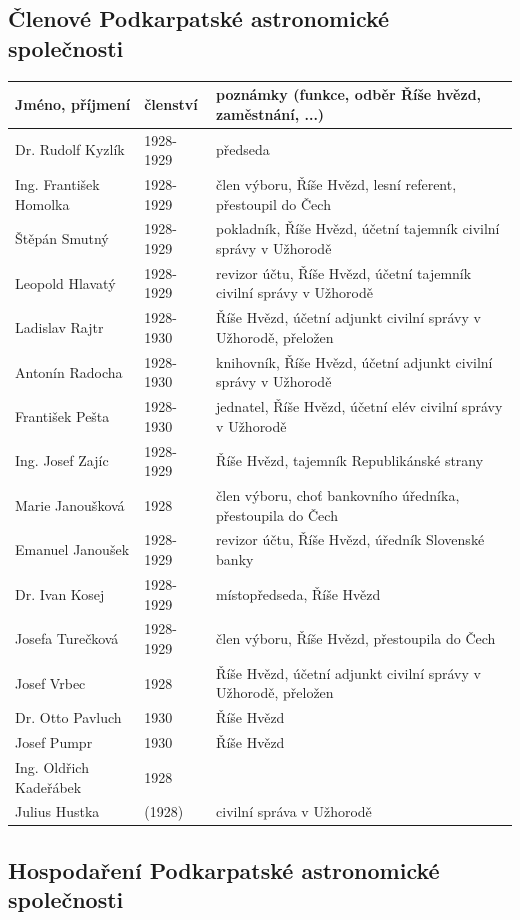 \documentclass[10pt,a5paper,twoside]{book}
\begin{document}
\subsection*{Členové Podkarpatské astronomické společnosti}

\begin{tabular}{l l p{5.5cm}}
\textbf{Jméno, příjmení}& \textbf{členství} & \textbf{poznámky (funkce, odběr Říše hvězd, zaměstnání, ...)} \\
\hline\hline
Dr. Rudolf Kyzlík				&1928-1929&	předseda\\
Ing. František Homolka	&1928-1929&	člen výboru, Říše Hvězd, lesní referent, přestoupil do Čech\\
Štěpán Smutný					&1928-1929&	pokladník, Říše Hvězd, účetní tajemník civilní správy v Užhorodě\\
Leopold Hlavatý				&1928-1929&	revizor účtu, Říše Hvězd, účetní tajemník civilní správy v Užhorodě\\
Ladislav Rajtr					&1928-1930&	Říše Hvězd, účetní adjunkt civilní správy v Užhorodě, přeložen\\
Antonín Radocha				&1928-1930&	knihovník, Říše Hvězd, účetní adjunkt civilní správy v Užhorodě\\
František Pešta					&1928-1930&	jednatel, Říše Hvězd, účetní elév civilní správy v Užhorodě\\
Ing. Josef Zajíc					&1928-1929&	Říše Hvězd, tajemník Republikánské strany\\
Marie Janoušková				&1928	&člen výboru, choť bankovního úředníka, přestoupila do Čech\\
Emanuel Janoušek			&1928-1929&	revizor účtu, Říše Hvězd, úředník Slovenské banky\\
Dr. Ivan Kosej					&1928-1929&	místopředseda, Říše Hvězd\\
Josefa Turečková				&1928-1929&	člen výboru, Říše Hvězd, přestoupila do Čech\\
Josef Vrbec							&1928	&Říše Hvězd, účetní adjunkt civilní správy v Užhorodě, přeložen\\
Dr. Otto Pavluch				&1930	&Říše Hvězd\\
Josef Pumpr						&1930	&Říše Hvězd\\
Ing. Oldřich Kadeřábek	&1928&\\
Julius Hustka						&(1928)&	civilní správa v Užhorodě\\
\end{tabular}
\newpage



\subsection*{Hospodaření Podkarpatské astronomické společnosti}
\end{document}
